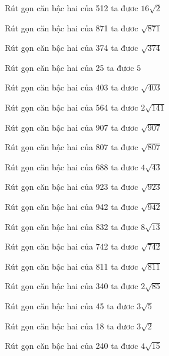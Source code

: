 \documentclass[12pt,a4paper]{article}
\begin{document}
\begin{ex}
Rút gọn căn bậc hai của 512 ta đươc $16\sqrt{2}$
\end{ex}
\begin{ex}
Rút gọn căn bậc hai của 871 ta đươc $\sqrt{871}$
\end{ex}
\begin{ex}
Rút gọn căn bậc hai của 374 ta đươc $\sqrt{374}$
\end{ex}
\begin{ex}
Rút gọn căn bậc hai của 25 ta đươc $5$
\end{ex}
\begin{ex}
Rút gọn căn bậc hai của 403 ta đươc $\sqrt{403}$
\end{ex}
\begin{ex}
Rút gọn căn bậc hai của 564 ta đươc $2\sqrt{141}$
\end{ex}
\begin{ex}
Rút gọn căn bậc hai của 907 ta đươc $\sqrt{907}$
\end{ex}
\begin{ex}
Rút gọn căn bậc hai của 807 ta đươc $\sqrt{807}$
\end{ex}
\begin{ex}
Rút gọn căn bậc hai của 688 ta đươc $4\sqrt{43}$
\end{ex}
\begin{ex}
Rút gọn căn bậc hai của 923 ta đươc $\sqrt{923}$
\end{ex}
\begin{ex}
Rút gọn căn bậc hai của 942 ta đươc $\sqrt{942}$
\end{ex}
\begin{ex}
Rút gọn căn bậc hai của 832 ta đươc $8\sqrt{13}$
\end{ex}
\begin{ex}
Rút gọn căn bậc hai của 742 ta đươc $\sqrt{742}$
\end{ex}
\begin{ex}
Rút gọn căn bậc hai của 811 ta đươc $\sqrt{811}$
\end{ex}
\begin{ex}
Rút gọn căn bậc hai của 340 ta đươc $2\sqrt{85}$
\end{ex}
\begin{ex}
Rút gọn căn bậc hai của 45 ta đươc $3\sqrt{5}$
\end{ex}
\begin{ex}
Rút gọn căn bậc hai của 18 ta đươc $3\sqrt{2}$
\end{ex}
\begin{ex}
Rút gọn căn bậc hai của 240 ta đươc $4\sqrt{15}$
\end{ex}
\end{document}
